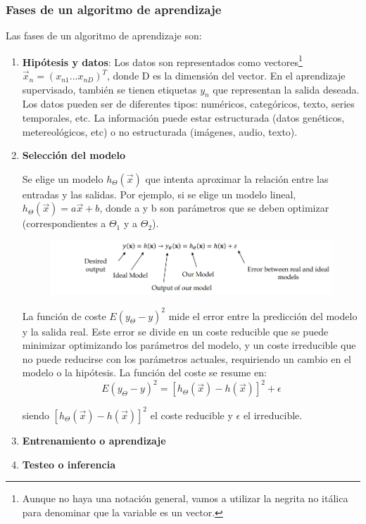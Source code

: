 \subsubsection{Fases de un algoritmo de aprendizaje}
Las fases de un algoritmo de aprendizaje son:
\begin{enumerate}
\item \textbf{Hipótesis y datos}: Los datos son representados como vectores\footnote{Aunque no haya una notación general, vamos a utilizar la negrita no itálica para denominar que la variable es un vector. }  $\vec{x}_n = (x_{n1} ... x_{nD})^T$, donde D es la dimensión del vector. En el aprendizaje supervisado, también se tienen etiquetas $y_n$ que representan la salida deseada. Los datos pueden ser de diferentes tipos: numéricos, categóricos, texto, series temporales, etc. La información puede estar estructurada (datos genéticos, metereológicos, etc) o no estructurada (imágenes, audio, texto).

\item \textbf{Selección del modelo}

Se elige un modelo $h_{\Theta}(\vec{x})$ que intenta aproximar la relación entre las entradas y las salidas. Por ejemplo, si se elige un modelo lineal, $h_{\Theta}(\vec{x}) = a\vec{x} + b$, donde a y b son parámetros que se deben optimizar (correspondientes a $\Theta_1$ y a $\Theta_2$). 

\begin{figure}[h]
\centering
\includegraphics[width = \textwidth]{figs/model-htheta.png}
\end{figure}

La función de coste $E(y_{\Theta} - y )^2$ mide el error entre la predicción del modelo y la salida real. Este error se divide en un coste reducible que se puede minimizar optimizando los parámetros del modelo, y un coste irreducible que no puede reducirse con los parámetros actuales, requiriendo un cambio en el modelo o la hipótesis. La función del coste se resume en:
$$E(y_{\Theta} - y)^2 = [h_{\Theta}(\vec{x}) - h(\vec{x})]^2 + \epsilon$$

siendo $ [h_{\Theta}(\vec{x}) - h(\vec{x})]^2$ el coste reducible y $\epsilon$ el irreducible. 

\item \textbf{Entrenamiento o aprendizaje}
\item \textbf{Testeo o inferencia}
\end{enumerate}

